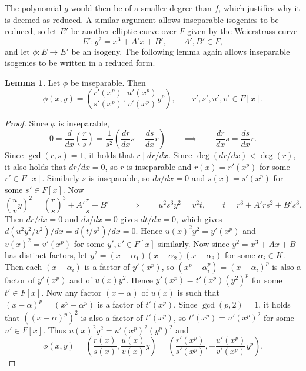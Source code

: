 \documentclass{article}
\newcommand{\rb}[1]{\left( #1 \right)}
\renewcommand{\sb}[1]{\left[ #1 \right]}
\theoremstyle{definition}\newtheorem*{definition}{Definition}
\theoremstyle{definition}\newtheorem*{example}{Example}
\theoremstyle{definition}\newtheorem*{remark}{Remark}
\newtheorem{lemma}[proposition]{Lemma}
\begin{document}
The polynomial $ g $ would then be of a smaller degree than $ f $, which justifies why it is deemed as reduced. A similar argument allows inseparable isogenies to be reduced, so let $ E' $ be another elliptic curve over $ F $ given by the Weierstrass curve
$$ E' : y^2 = x^3 + A'x + B', \qquad A', B' \in F,  $$
and let $ \phi : E \to E' $ be an isogeny. The following lemma again allows inseparable isogenies to be written in a reduced form.

\begin{lemma}
Let $ \phi $ be inseparable. Then
$$ \phi\rb{x, y} = \rb{\dfrac{r'\rb{x^p}}{s'\rb{x^p}}, \dfrac{u'\rb{x^p}}{v'\rb{x^p}}y^p}, \qquad r', s', u', v' \in F\sb{x}. $$
\end{lemma}

\begin{proof}
Since $ \phi $ is inseparable,
$$ 0 = \dfrac{d}{dx}\rb{\dfrac{r}{s}} = \dfrac{1}{s^2}\rb{\dfrac{dr}{dx}s - \dfrac{ds}{dx}r} \qquad \implies \qquad \dfrac{dr}{dx}s = \dfrac{ds}{dx}r. $$
Since $ \gcd\rb{r, s} = 1 $, it holds that $ r \mid dr / dx $. Since $ \deg\rb{dr / dx} < \deg\rb{r} $, it also holds that $ dr / dx = 0 $, so $ r $ is inseparable and $ r\rb{x} = r'\rb{x^p} $ for some $ r' \in F\sb{x} $. Similarly $ s $ is inseparable, so $ ds / dx = 0 $ and $ s\rb{x} = s'\rb{x^p} $ for some $ s' \in F\sb{x} $. Now
$$ \rb{\dfrac{u}{v}y}^2 = \rb{\dfrac{r}{s}}^3 + A'\dfrac{r}{s} + B' \qquad \implies \qquad u^2s^3y^2 = v^2t, \qquad t = r^3 + A'rs^2 + B's^3. $$
Then $ dr / dx = 0 $ and $ ds / dx = 0 $ gives $ dt / dx = 0 $, which gives $ d\rb{u^2y^2 / v^2} / dx = d\rb{t / s^3} / dx = 0 $. Hence $ u\rb{x}^2y^2 = y'\rb{x^p} $ and $ v\rb{x}^2 = v'\rb{x^p} $ for some $ y', v' \in F\sb{x} $ similarly. Now since $ y^2 = x^3 + Ax + B $ has distinct factors, let $ y^2 = \rb{x - \alpha_1}\rb{x - \alpha_2}\rb{x - \alpha_3} $ for some $ \alpha_i \in K $. Then each $ \rb{x - \alpha_i} $ is a factor of $ y'\rb{x^p} $, so $ \rb{x^p - \alpha_i^p} = \rb{x - \alpha_i}^p $ is also a factor of $ y'\rb{x^p} $ and of $ u\rb{x}y^2 $. Hence $ y'\rb{x^p} = t'\rb{x^p}\rb{y^2}^p $ for some $ t' \in F\sb{x} $. Now any factor $ \rb{x - \alpha} $ of $ u\rb{x} $ is such that $ \rb{x - \alpha}^p = \rb{x^p - \alpha^p} $ is a factor of $ t'\rb{x^p} $. Since $ \gcd\rb{p, 2} = 1 $, it holds that $ \rb{\rb{x - \alpha}^p}^2 $ is also a factor of $ t'\rb{x^p} $, so $ t'\rb{x^p} = u'\rb{x^p}^2 $ for some $ u' \in F\sb{x} $. Thus $ u\rb{x}^2y^2 = u'\rb{x^p}^2\rb{y^p}^2 $ and
$$ \phi\rb{x, y} = \rb{\dfrac{r\rb{x}}{s\rb{x}}, \dfrac{u\rb{x}}{v\rb{x}}y} = \rb{\dfrac{r'\rb{x^p}}{s'\rb{x^p}}, \pm\dfrac{u'\rb{x^p}}{v'\rb{x^p}}y^p}. $$
\end{proof}
\end{document}
